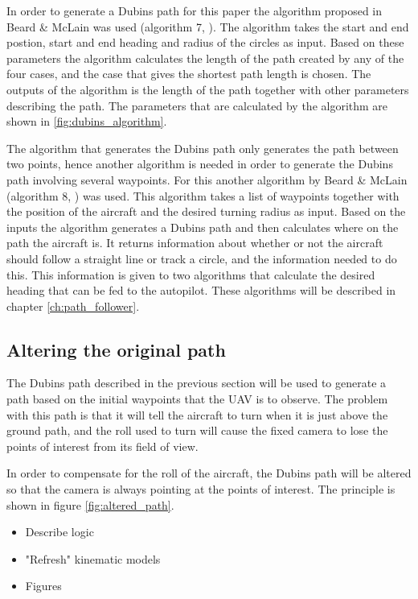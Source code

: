 In order to generate a Dubins path for this paper the algorithm proposed in Beard \& McLain was used (algorithm 7, \cite{suaBEARD}). The algorithm takes the start and end postion, start and end heading and radius of the circles as input. Based on these parameters the algorithm calculates the length of the path created by any of the four cases, and the case that gives the shortest path length is chosen. The outputs of the algorithm is the length of the path together with other parameters describing the path. The parameters that are calculated by the algorithm are shown in \ref{fig:dubins_algorithm}.

The algorithm that generates the Dubins path only generates the path between two points, hence another algorithm is needed in order to generate the Dubins path involving several waypoints. For this another algorithm by Beard \& McLain (algorithm 8, \cite{suaBEARD}) was used. This algorithm takes a list of waypoints together with the position of the aircraft and the desired turning radius as input. Based on the inputs the algorithm generates a Dubins path and then calculates where on the path the aircraft is. It returns information about whether or not the aircraft should follow a straight line or track a circle, and the information needed to do this. This information is given to two algorithms that calculate the desired heading that can be fed to the autopilot. These algorithms will be described in chapter \ref{ch:path_follower}.


\subsection{Altering the original path}

The Dubins path described in the previous section will be used to generate a path based on the initial waypoints that the UAV is to observe. The problem with this path is that it will tell the aircraft to turn when it is just above the ground path, and the roll used to turn will cause the fixed camera to lose the points of interest from its field of view. 

In order to compensate for the roll of the aircraft, the Dubins path will be altered so that the camera is always pointing at the points of interest. The principle is shown in figure \ref{fig:altered_path}. 

\begin{itemize}
	\item Describe logic
	\item "Refresh" kinematic models
	\item Figures
\end{itemize}


